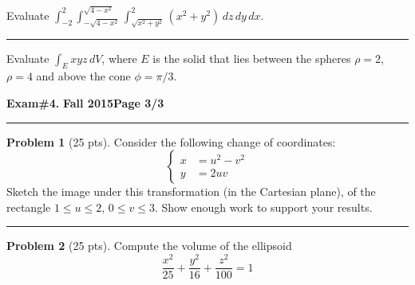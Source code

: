 \documentclass[12pt]{article}
\theoremstyle{definition}
\newtheorem{problem}{Problem}
\begin{document}
\bigskip
{\problem[25 pts] Evaluate $\displaystyle{\int_{-2}^2
\int_{-\sqrt{4-x^2}}^{\sqrt{4-x^2}} \int_{\sqrt{x^2+y^2}}^{2}
(x^2+y^2)\, dz\, dy\, dx}$.}
\vspace{6cm}
\begin{flushright}
\end{flushright}
\hrule
{\problem[25 pts] Evaluate $\displaystyle{\int_E xyz\, dV}$, where
$E$ is the solid that lies between the spheres $\rho=2$, $\rho=4$ and above the cone
$\phi=\pi/3$.}
\vspace{10cm}
\begin{flushright}
\end{flushright}
\newpage

\hfill{\large\bf Exam\#4.}\hfill{\large\bf
  Fall 2015}\hfill{\large\bf Page 3/3}\hrule

\bigskip
\begin{problem}[25 pts]
Consider the following change of coordinates:
\begin{equation*}
\begin{cases}
x &= u^2 - v^2 \\
y &= 2uv
\end{cases}
\end{equation*}
Sketch the image under this transformation (in the Cartesian plane), of the rectangle $1 \leq u \leq 2$, $0 \leq v \leq 3$.  Show enough work to support your results.

\vspace{12cm}
\end{problem}

\hrule
\begin{problem}[25 pts] 
Compute the volume of the ellipsoid
\begin{equation*}
\frac{x^2}{25} + \frac{y^2}{16} + \frac{z^2}{100} = 1
\end{equation*}
\vspace{4cm}
\begin{flushright}
\end{flushright}
\end{problem}
\newpage
\end{document}
